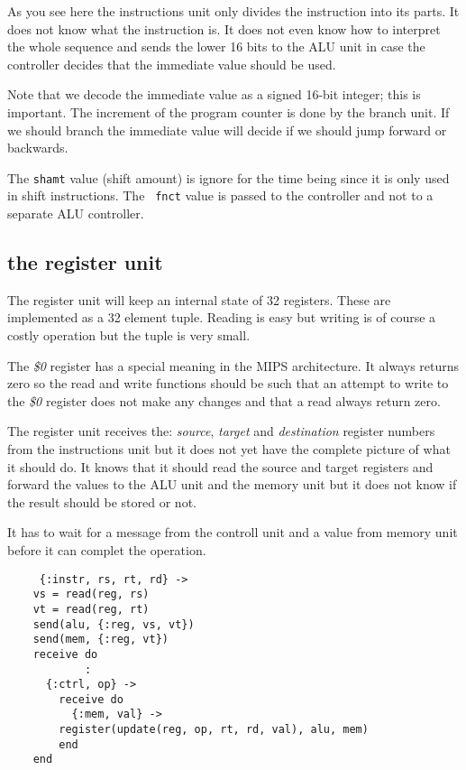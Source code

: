 \documentclass[a4paper,11pt]{article}
\begin{document}
As you see here the instructions unit only divides the instruction
into its parts. It does not know what the instruction is. It does
not even know how to interpret the whole sequence and sends the lower
16 bits to the ALU unit in case the controller decides that the
immediate value should be used.

Note that we decode the immediate value as a signed 16-bit integer;
this is important. The increment of the program counter is done by the
branch unit. If we should branch the immediate value will decide if we
should jump forward or backwards. 

The {\tt shamt} value (shift amount) is ignore for
the time being since it is only used in shift instructions. The {\tt
  fnct} value is passed to the controller and not to a separate ALU
controller.


\subsection{the register unit}

The register unit will keep an internal state of 32 registers. These
are implemented as a 32 element tuple. Reading is easy but writing
is of course a costly operation but the tuple is very small. 

The {\em \$0} register has a special meaning in the MIPS
architecture. It always returns zero so the read and write functions
should be such that an attempt to write to the {\em \$0} register does
not make any changes and that a read always return zero.

The register unit receives the: {\em source}, {\em target} and {\em
destination} register numbers from the instructions unit but it does not
yet have the complete picture of what it should do. It knows that it should
read the source and target registers and forward the values to the ALU
unit and the memory unit but it does not know if the result should be
stored or not.

It has to wait for a message from the controll unit and a value from
memory unit before it can complet the operation.

\begin{verbatim}
     {:instr, rs, rt, rd} ->
	vs = read(reg, rs)
	vt = read(reg, rt)
	send(alu, {:reg, vs, vt})
	send(mem, {:reg, vt})
	receive do
            :
	  {:ctrl, op} ->
	    receive do
	      {:mem, val} ->
		register(update(reg, op, rt, rd, val), alu, mem)
	    end
	end
\end{verbatim}
\end{document}
